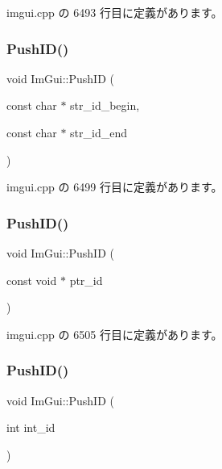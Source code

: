  imgui.\+cpp の 6493 行目に定義があります。

\mbox{\label{namespace_im_gui_af5e55788830807a7c53d5dd7865b692a}} 
\subsubsection{\texorpdfstring{Push\+I\+D()}{PushID()}\hspace{0.1cm}{\footnotesize\ttfamily [2/4]}}
{\footnotesize\ttfamily void Im\+Gui\+::\+Push\+ID (\begin{DoxyParamCaption}\item[{const char $\ast$}]{str\+\_\+id\+\_\+begin,  }\item[{const char $\ast$}]{str\+\_\+id\+\_\+end }\end{DoxyParamCaption})}



 imgui.\+cpp の 6499 行目に定義があります。

\mbox{\label{namespace_im_gui_af9cf42fdf2fbc5eeec7521de14996bfb}} 
\subsubsection{\texorpdfstring{Push\+I\+D()}{PushID()}\hspace{0.1cm}{\footnotesize\ttfamily [3/4]}}
{\footnotesize\ttfamily void Im\+Gui\+::\+Push\+ID (\begin{DoxyParamCaption}\item[{const void $\ast$}]{ptr\+\_\+id }\end{DoxyParamCaption})}



 imgui.\+cpp の 6505 行目に定義があります。

\mbox{\label{namespace_im_gui_a6a11664be2a0b9a0e7054bb339e009ac}} 
\subsubsection{\texorpdfstring{Push\+I\+D()}{PushID()}\hspace{0.1cm}{\footnotesize\ttfamily [4/4]}}
{\footnotesize\ttfamily void Im\+Gui\+::\+Push\+ID (\begin{DoxyParamCaption}\item[{int}]{int\+\_\+id }\end{DoxyParamCaption})}



